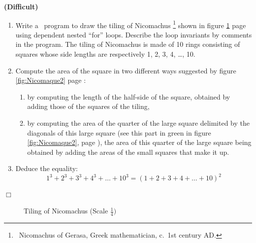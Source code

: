 \begin{exercice}{{\bf (Difficult)}
\begin{enumerate}
\item Write a \python\ program to draw the tiling of Nicomachus\@%
\footnote{\ Nicomachus of Gerasa, Greek mathematician, c.\ 1st century AD.}
shown in figure
\ref{fig:Nicomaque}  page \pageref{fig:Nicomaque} using dependent nested
``for'' loops. Describe the loop invariants
by comments in the program. The tiling of Nicomachus is made of 10
rings consisting of squares whose side lengths
are respectively 1, 2, 3, 4, \ldots, 10.

\item Compute the area of the square in two different ways
suggested by figure \ref{fig:Nicomaque2}
page \pageref{fig:Nicomaque2}:
 \begin{enumerate}
  \item by computing the length of the half-side of the square, obtained by adding
        those of the squares of the tiling,
  \item by computing the area of the quarter of the large square delimited by
   the diagonals of this large square (see this part in green in
   figure \ref{fig:Nicomaque2}, page \pageref{fig:Nicomaque2}), the area of this quarter of the large square
   being obtained by adding the areas of the small squares that make it up.
 \end{enumerate}
\item Deduce the equality:
\[ 1^{3} + 2^{3} + 3^{3} + 4^{3} + \ldots + 10^{3} = (1 + 2 + 3 + 4 + \ldots + 10)^{2}\]
\end{enumerate}
\noindent $\Box$}\end{exercice}
\begin{figure}[htbp]
 \caption{Tiling of Nicomachus (Scale $\frac{1}{4})$}
 \label{fig:Nicomaque}
\end{figure}

